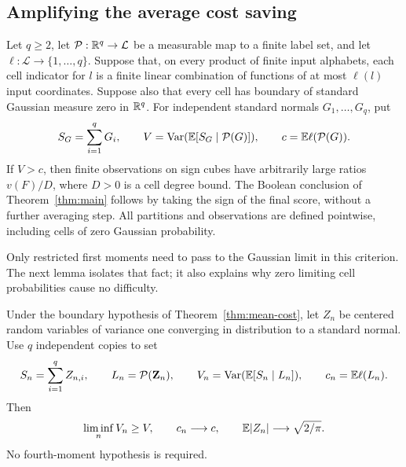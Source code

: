\subsection{Amplifying the average cost saving}

\begin{theorem}
\label{thm:mean-cost}
Let $q\ge2$, let $\mathcal P:\mathbb R^q\to\mathcal L$ be a measurable map
to a finite label set, and let $\ell:\mathcal L\to\{1,\ldots,q\}$.
Suppose that, on every product of finite input alphabets, each cell
indicator for $l$ is a finite linear combination of functions of at
most $\ell(l)$ input coordinates.  Suppose also that every cell has
boundary of standard Gaussian measure zero in $\mathbb R^q$.  For independent standard
normals $G_1,\ldots,G_q$, put
\[
 S_G=\sum_{i=1}^qG_i,\qquad
 V=\operatorname{Var}(\mathbb E[S_G\mid\mathcal P(G)]),\qquad
 c=\mathbb E\ell(\mathcal P(G)).
\]
If $V>c$, then finite observations on sign cubes have arbitrarily
large ratios $v(F)/D$, where $D>0$ is a cell degree bound.
The Boolean conclusion of Theorem~\ref{thm:main} follows by taking the
sign of the final score, without a further averaging step.
All partitions and observations are defined pointwise, including
cells of zero Gaussian probability.
\end{theorem}

Only restricted first moments need to pass to the Gaussian limit in
this criterion.  The next lemma isolates that fact; it also explains
why zero limiting cell probabilities cause no difficulty.

\begin{lemma}
\label{lem:mc-transfer}
Under the boundary hypothesis of Theorem~\ref{thm:mean-cost}, let
$Z_n$ be centered random variables of variance one converging in
distribution to a standard normal.  Use $q$ independent copies to set
\[
 S_n=\sum_{i=1}^qZ_{n,i},\qquad L_n=\mathcal P(\mathbf Z_n),\qquad
 V_n=\operatorname{Var}(\mathbb E[S_n\mid L_n]),\qquad c_n=\mathbb E\ell(L_n).
\]
Then
\[
 \liminf_n V_n\ge V,\qquad c_n\longrightarrow c,
 \qquad \mathbb E|Z_n|\longrightarrow\sqrt{2/\pi}.
\]
No fourth-moment hypothesis is required.
\end{lemma}

